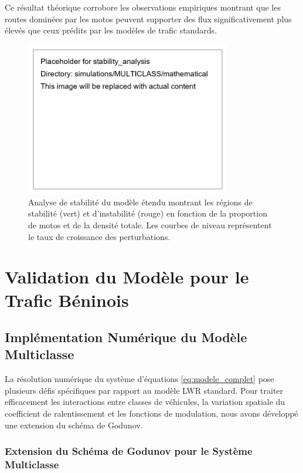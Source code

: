 Ce résultat théorique corrobore les observations empiriques montrant que les routes dominées par les motos peuvent supporter des flux significativement plus élevés que ceux prédits par les modèles de trafic standards.

\begin{figure}[htbp]
\centering
\includegraphics[width=0.8\textwidth]{simulations/MULTICLASS/mathematical/stability_analysis}
\caption{Analyse de stabilité du modèle étendu montrant les régions de stabilité (vert) et d'instabilité (rouge) en fonction de la proportion de motos et de la densité totale. Les courbes de niveau représentent le taux de croissance des perturbations.}
\label{fig:stability_analysis_extension}
\end{figure}

\section{Validation du Modèle pour le Trafic Béninois}
\label{sec:validation_benin}

\subsection{Implémentation Numérique du Modèle Multiclasse}
\label{subsec:implementation_numerique}

La résolution numérique du système d'équations \eqref{eq:modele_complet} pose plusieurs défis spécifiques par rapport au modèle LWR standard. Pour traiter efficacement les interactions entre classes de véhicules, la variation spatiale du coefficient de ralentissement et les fonctions de modulation, nous avons développé une extension du schéma de Godunov.

\subsubsection{Extension du Schéma de Godunov pour le Système Multiclasse}
\label{subsubsec:extension_godunov}

